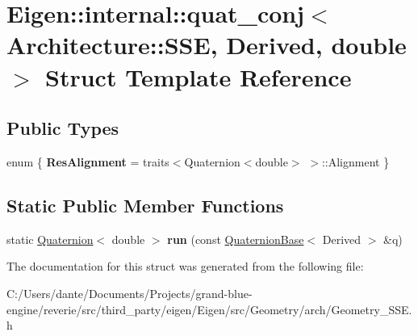 \hypertarget{struct_eigen_1_1internal_1_1quat__conj_3_01_architecture_1_1_s_s_e_00_01_derived_00_01double_01_4}{}\section{Eigen\+::internal\+::quat\+\_\+conj$<$ Architecture\+::S\+SE, Derived, double $>$ Struct Template Reference}
\label{struct_eigen_1_1internal_1_1quat__conj_3_01_architecture_1_1_s_s_e_00_01_derived_00_01double_01_4}
\subsection*{Public Types}
\begin{DoxyCompactItemize}
\item 
\mbox{\label{struct_eigen_1_1internal_1_1quat__conj_3_01_architecture_1_1_s_s_e_00_01_derived_00_01double_01_4_a16b9e9cac352d6876c4be40d14a49d49}} 
enum \{ {\bfseries Res\+Alignment} = traits$<$Quaternion$<$double$>$ $>$\+::Alignment
 \}
\end{DoxyCompactItemize}
\subsection*{Static Public Member Functions}
\begin{DoxyCompactItemize}
\item 
\mbox{\label{struct_eigen_1_1internal_1_1quat__conj_3_01_architecture_1_1_s_s_e_00_01_derived_00_01double_01_4_afbb05c8c91c03e8911289353bd9324d3}} 
static \mbox{\hyperlink{class_eigen_1_1_quaternion}{Quaternion}}$<$ double $>$ {\bfseries run} (const \mbox{\hyperlink{class_eigen_1_1_quaternion_base}{Quaternion\+Base}}$<$ Derived $>$ \&q)
\end{DoxyCompactItemize}


The documentation for this struct was generated from the following file\+:\begin{DoxyCompactItemize}
\item 
C\+:/\+Users/dante/\+Documents/\+Projects/grand-\/blue-\/engine/reverie/src/third\+\_\+party/eigen/\+Eigen/src/\+Geometry/arch/Geometry\+\_\+\+S\+S\+E.\+h\end{DoxyCompactItemize}
